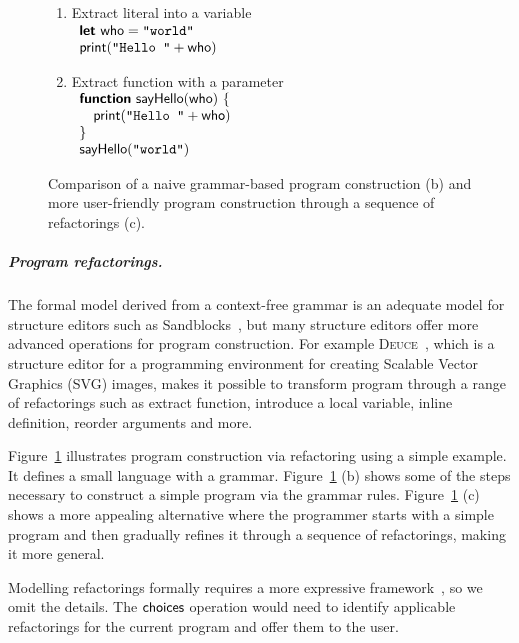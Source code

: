 \documentclass[ a4paper,UKenglish,cleveref, autoref, thm-restate]{lipics-v2021}
\newcommand{\ident}[1]{\textsf{#1}}
\newcommand{\kvd}[1]{\textsf{\bfseries #1}}
\newcommand{\choices}{\textnormal{\ident{choices}}}
\begin{document}
\begin{figure}[t]
\begin{minipage}[t]{.5\textwidth}
\begin{enumerate}
\item Extract literal into a variable\\[0.75em]
  $\begin{array}{l}
  \kvd{let}~\ident{who} = \texttt{''world''}\\
  \ident{print}(\texttt{''Hello ''} + \ident{who})
  \end{array}$

\item Extract function with a parameter\\[0.75em]
  $\begin{array}{l}
  \kvd{function}~\ident{sayHello}(\ident{who})~\{\\
  \quad\ident{print}(\texttt{''Hello ''} + \ident{who})\\
  \}\\
  \ident{sayHello}(\texttt{''world''})
  \end{array}$

\end{enumerate}
\end{minipage}
\caption{Comparison of a naive grammar-based program construction (b) and more user-friendly
  program construction through a sequence of refactorings (c).}
\label{fig:grammar}
\end{figure}

\subparagraph{Program refactorings.}
The formal model derived from a context-free grammar is an adequate model for structure
editors such as Sandblocks~\cite{beckmann-2023-all}, but many structure editors offer more
advanced operations for program construction. For example \textsc{Deuce}~\cite{hempel-2018-deuce},
which is a structure editor for a programming environment for creating Scalable
Vector Graphics (SVG) images, makes it possible to transform program through
a range of refactorings such as extract function, introduce a local variable, inline definition,
reorder arguments and more.

Figure~\ref{fig:grammar} illustrates program construction via refactoring using a simple
example. It defines a small language with a grammar. Figure~\ref{fig:grammar} (b) shows some
of the steps necessary to construct a simple program via the grammar rules.
Figure~\ref{fig:grammar} (c) shows a more appealing alternative where the programmer starts
with a simple program and then gradually refines it through a sequence of refactorings,
making it more general.

Modelling refactorings formally requires a more expressive framework~\cite{steimann-2011-refactoring},
so we omit the details. The $\choices$ operation would need to identify applicable refactorings
for the current program and offer them to the user.
\end{document}
